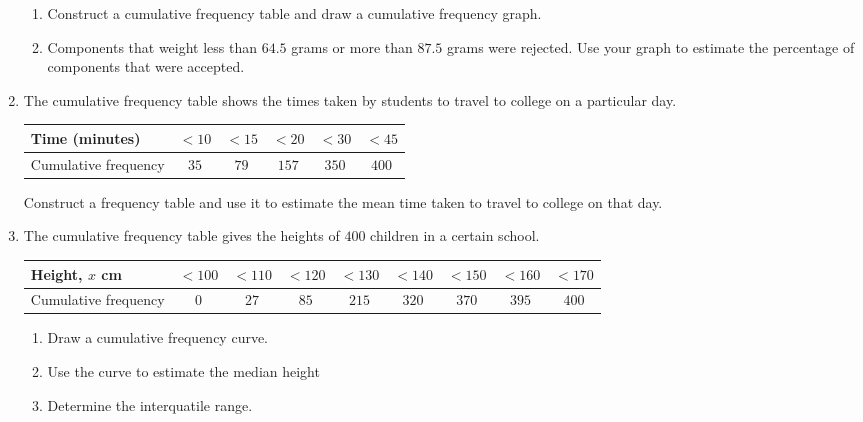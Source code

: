 \begin{enumerate}
\smallskip

\begin{enumerate}
	\item Construct a cumulative frequency table and draw a cumulative frequency graph.
	\item  Components that weight less than $64.5$ grams or more than $87.5$ grams were rejected. Use your graph to estimate the percentage of components that were accepted.
\end{enumerate}



\item  The cumulative frequency table shows the times taken by students to travel to college on a particular day.

\medskip

\renewcommand{\arraystretch}{1.2} %
\begin{tabular}{|l|c|c|c|c|c|}
	\hline
	Time (minutes)  & $ < 10 $ & $ < 15 $ & $ < 20 $ & $ <30 $ & $ <45 $   \\ 
	\hline
	Cumulative frequency & $35$ & $79$ & $157$ & $350$ & $400$  \\ 
	\hline
\end{tabular}

\smallskip

Construct a frequency table and use it to estimate the mean time taken 	to travel to college on that day.


\item The cumulative frequency table gives 	the heights of $400$ children in a certain school.

\medskip

\renewcommand{\arraystretch}{1.2} %
\begin{tabular}{|l|c|c|c|c|c|c|c|c|}
	\hline
	Height, $x$ \si{\cm}  & $ < 100 $ & $ < 110 $ & $ < 120 $ & $ <130 $ & $ <140 $ & $< 150$& $<160$& $<170$   \\ 
	\hline
	Cumulative frequency & $0$ & $27$ & $85$ & $215$ & $320$ & $370$ & $395$ & $400$  \\ 
	\hline
\end{tabular}

\smallskip

\begin{enumerate}
	\item Draw a cumulative frequency curve.
	\item Use the curve to estimate the median height
	\item Determine the interquatile range.
\end{enumerate}


\end{enumerate}

